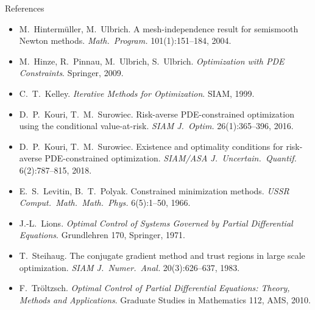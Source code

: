 \documentclass[main.tex]{subfiles}
\begin{document}
\begin{frame}[allowframebreaks]{References}
\begin{itemize}
    \item M.~Hinterm\"uller, M.~Ulbrich. A mesh-independence result for semismooth Newton methods. \emph{Math.\ Program.} 101(1):151--184, 2004. 
    \item M.~Hinze, R.~Pinnau, M.~Ulbrich, S.~Ulbrich. \emph{Optimization with PDE Constraints}. Springer, 2009. 
    \item C.~T.~Kelley. \emph{Iterative Methods for Optimization}. SIAM, 1999. 
    \item D.~P.~Kouri, T.~M.~Surowiec. Risk-averse PDE-constrained optimization using the conditional value-at-risk. \emph{SIAM J.\ Optim.} 26(1):365--396, 2016. 
    \item D.~P.~Kouri, T.~M.~Surowiec. Existence and optimality conditions for risk-averse PDE-constrained optimization. \emph{SIAM/ASA J.\ Uncertain.\ Quantif.} 6(2):787--815, 2018. 
    \item E.~S.~Levitin, B.~T.~Polyak. Constrained minimization methods. \emph{USSR Comput.\ Math.\ Math.\ Phys.} 6(5):1--50, 1966. 
    \item J.-L.~Lions. \emph{Optimal Control of Systems Governed by Partial Differential Equations}. Grundlehren 170, Springer, 1971. 
    \item T.~Steihaug. The conjugate gradient method and trust regions in large scale optimization. \emph{SIAM J.\ Numer.\ Anal.} 20(3):626--637, 1983. 
    \item F.~Tr\"oltzsch. \emph{Optimal Control of Partial Differential Equations: Theory, Methods and Applications}. Graduate Studies in Mathematics 112, AMS, 2010. 
  \end{itemize}
\end{frame}
\end{document}
